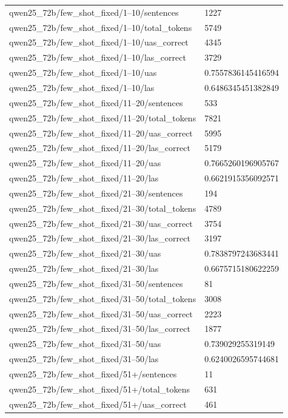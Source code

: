 \begin{tabular}{ll}
qwen25\_72b/few\_shot\_fixed/1–10/sentences & 1227 \\
qwen25\_72b/few\_shot\_fixed/1–10/total\_tokens & 5749 \\
qwen25\_72b/few\_shot\_fixed/1–10/uas\_correct & 4345 \\
qwen25\_72b/few\_shot\_fixed/1–10/las\_correct & 3729 \\
qwen25\_72b/few\_shot\_fixed/1–10/uas & 0.7557836145416594 \\
qwen25\_72b/few\_shot\_fixed/1–10/las & 0.6486345451382849 \\
qwen25\_72b/few\_shot\_fixed/11–20/sentences & 533 \\
qwen25\_72b/few\_shot\_fixed/11–20/total\_tokens & 7821 \\
qwen25\_72b/few\_shot\_fixed/11–20/uas\_correct & 5995 \\
qwen25\_72b/few\_shot\_fixed/11–20/las\_correct & 5179 \\
qwen25\_72b/few\_shot\_fixed/11–20/uas & 0.7665260196905767 \\
qwen25\_72b/few\_shot\_fixed/11–20/las & 0.6621915356092571 \\
qwen25\_72b/few\_shot\_fixed/21–30/sentences & 194 \\
qwen25\_72b/few\_shot\_fixed/21–30/total\_tokens & 4789 \\
qwen25\_72b/few\_shot\_fixed/21–30/uas\_correct & 3754 \\
qwen25\_72b/few\_shot\_fixed/21–30/las\_correct & 3197 \\
qwen25\_72b/few\_shot\_fixed/21–30/uas & 0.7838797243683441 \\
qwen25\_72b/few\_shot\_fixed/21–30/las & 0.6675715180622259 \\
qwen25\_72b/few\_shot\_fixed/31–50/sentences & 81 \\
qwen25\_72b/few\_shot\_fixed/31–50/total\_tokens & 3008 \\
qwen25\_72b/few\_shot\_fixed/31–50/uas\_correct & 2223 \\
qwen25\_72b/few\_shot\_fixed/31–50/las\_correct & 1877 \\
qwen25\_72b/few\_shot\_fixed/31–50/uas & 0.739029255319149 \\
qwen25\_72b/few\_shot\_fixed/31–50/las & 0.6240026595744681 \\
qwen25\_72b/few\_shot\_fixed/51+/sentences & 11 \\
qwen25\_72b/few\_shot\_fixed/51+/total\_tokens & 631 \\
qwen25\_72b/few\_shot\_fixed/51+/uas\_correct & 461 \\

\end{tabular}
